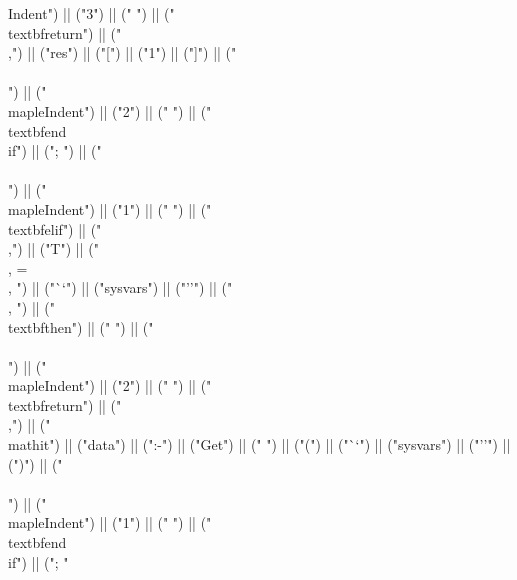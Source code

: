 \documentclass{article}
\begin{document}
\begin{center}
\begin{maplelatex}
{Indent{") || ("3") || ("} ") || ("\\textbf{return}") || ("\\,") || ("res") || ("[") || ("1") || ("]") || ("\\\\\n") || ("\\mapleIndent{") || ("2") || ("} ") || ("\\textbf{end\\ if}") || ("; ") || ("\\\\\n") || ("\\mapleIndent{") || ("1") || ("} ") || ("\\textbf{elif}") || (" \\,") || ("T") || (" \\, = \\, ") || ("``") || ("sysvars") || ("''") || (" \\, ") || ("\\textbf{then}") || (" ") || ("\\\\\n") || ("\\mapleIndent{") || ("2") || ("} ") || ("\\textbf{return}") || ("\\,") || ("\\mathit{") || ("data") || (":-") || ("Get") || ("} ") || ("(") || ("``") || ("sysvars") || ("''") || (")") || ("\\\\\n") || ("\\mapleIndent{") || ("1") || ("} ") || ("\\textbf{end\\ if}") || ("; "}
\end{maplelatex}
\end{center}
\end{document}
